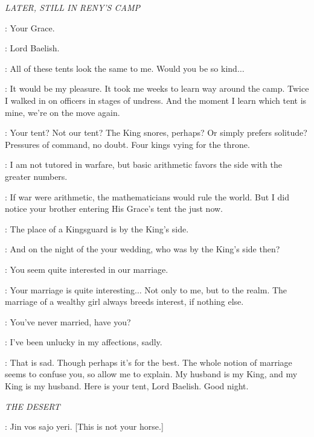 \scene

\textit{LATER, STILL IN RENY'S CAMP} 


\LITTLEFINGER: Your Grace. 

\MARGAERY: Lord Baelish. 

\LITTLEFINGER: All of these tents look the same to me. Would you be so kind$\ldots$  

\MARGAERY: It would be my pleasure. It took me weeks to learn way around the camp. Twice I walked in on officers in stages of undress. And the moment I learn which tent is mine, we're on the move again. 

\LITTLEFINGER: Your tent? Not our tent? The King snores, perhaps? Or simply prefers solitude? Pressures of command, no doubt. Four kings vying for the throne. 

\MARGAERY: I am not tutored in warfare, but basic arithmetic favors the side with the greater numbers. 

\LITTLEFINGER: If war were arithmetic, the mathematicians would rule the world. But I did notice your brother entering His Grace's tent the just now. 

\MARGAERY: The place of a Kingsguard is by the King's side. 

\LITTLEFINGER: And on the night of the your wedding, who was by the King's side then? 

\MARGAERY: You seem quite interested in our marriage. 

\LITTLEFINGER: Your marriage is quite interesting$\ldots$ Not only to me, but to the realm. The marriage of a wealthy girl always breeds interest, if nothing else. 

\MARGAERY: You've never married, have you? 

\LITTLEFINGER: I've been unlucky in my affections, sadly. 

\MARGAERY: That is sad. Though perhaps it's for the best. The whole notion of marriage seems to confuse you, so allow me to explain. My husband is my King, and my King is my husband. Here is your tent, Lord Baelish. Good night. 


\scene

\textit{THE DESERT} 


\DAENERYS: Jin vos sajo yeri. [This is not your horse.] 

